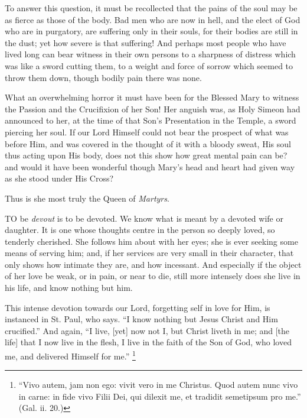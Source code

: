 To answer this question, it must
be recollected that the pains of the soul may be as fierce as those of
the body. Bad men who are now in hell, and the elect of God who are in
purgatory, are suffering only in their souls, for their bodies are still
in the dust; yet how severe is that suffering! And perhaps most
people who have lived long can bear witness in their own persons to a
sharpness of distress which was like a sword cutting them, to a weight
and force of sorrow which seemed to throw them down, though bodily pain
there was none.

What an overwhelming horror it
must have been for the Blessed Mary to witness the Passion and the
Crucifixion of her Son! Her anguish was, as Holy Simeon had announced to
her, at the time of that Son's Presentation in the Temple, a sword
piercing her soul. If our Lord Himself could not bear the prospect of
what was before Him, and was covered in the thought of it with a bloody
sweat, His soul thus acting upon His body, does not this show how great
mental pain can be? and would it have been wonderful though Mary's head
and heart had given way as she stood under His Cross?

Thus is she most truly the Queen
of \emph{Martyrs}.



TO
be \emph{devout} is to be devoted. We know what is meant by a devoted
wife or daughter. It is one whose thoughts centre in the person so
deeply loved, so tenderly cherished. She follows him about with her
eyes; she is ever seeking some means of serving him; and, if her
services are very small in their character, that only shows how intimate
they are, and how incessant. And especially if the object of her love be
weak, or in pain, or near to die, still more intensely does she live in
his life, and know nothing but him.

This intense devotion towards
our Lord, forgetting self in love for Him, is instanced in St. Paul, who
says. ``I know nothing but Jesus Christ and Him crucified.'' And again, ``I
live, [yet] now not I, but Christ liveth in me; and [the life] that I
now live in the flesh, I live in the faith of the Son of God, who loved
me, and delivered Himself for me.'' \footnote{``Vivo autem, jam non ego: vivit vero in me Christus. Quod autem nunc
vivo in carne: in fide vivo Filii Dei, qui dilexit me, et tradidit
semetipsum pro me.'' (Gal. ii. 20.)}

